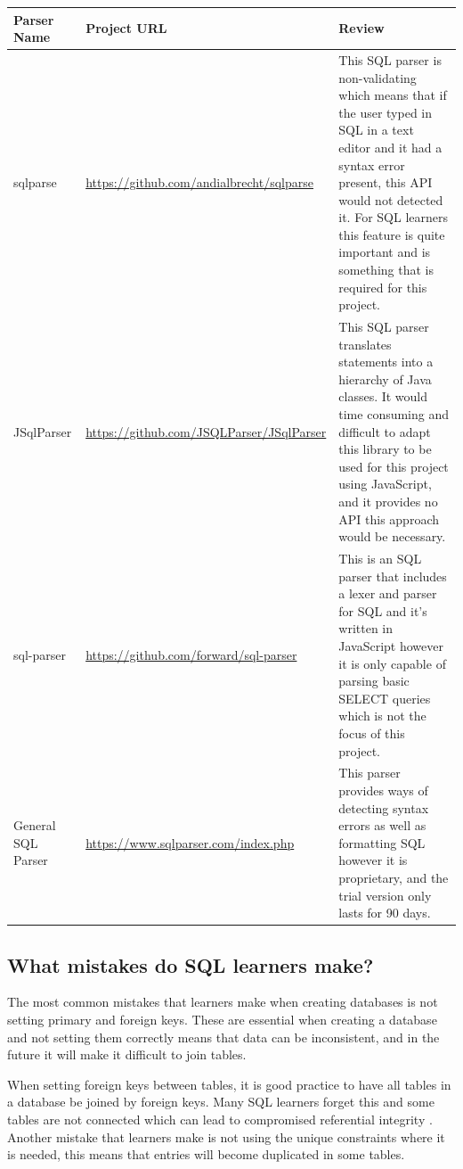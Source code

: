 \begin{center}
	\setlength\extrarowheight{2pt}
	\begin{tabularx}{\textwidth}{|X|X|X|}
		\hline
		\textbf{Parser Name} & \textbf{Project URL} & \textbf{Review} \\
		\hline
		sqlparse & \url{https://github.com/andialbrecht/sqlparse} &  This SQL parser is non-validating which means that if the user typed in SQL in a text editor and it had a syntax error present, this API would not detected it. For SQL learners this feature is quite important and is something that is required for this project.\\
		\hline
		JSqlParser & \url{https://github.com/JSQLParser/JSqlParser} &  This SQL parser translates statements into a hierarchy of Java classes. It would time consuming and difficult to adapt this library to be used for this project using JavaScript, and it provides no API this approach would be necessary.\\
		\hline
		sql-parser & \url{https://github.com/forward/sql-parser} & This is an SQL parser that includes a lexer and parser for SQL and it's written in JavaScript however it is only capable of parsing basic SELECT queries which is not the focus of this project.\\
		\hline
		General SQL Parser & \url{https://www.sqlparser.com/index.php} & This parser provides ways of detecting syntax errors as well as formatting SQL however it is proprietary, and the trial version only lasts for 90 days.\\
		\hline
	\end{tabularx}
	
\end{center}

\subsection{What mistakes do SQL learners make?}

The most common mistakes that learners make when creating databases is not setting primary and foreign keys. These are essential when creating a database and not setting them correctly means that data can be inconsistent, and in the future it will make it difficult to join tables.

When setting foreign keys between tables, it is good practice to have all tables in a database be joined by foreign keys. Many SQL learners forget this and some tables are not connected which can lead to compromised referential integrity \cite{astera}. Another mistake that learners make is not using the unique constraints where it is needed, this means that entries will become duplicated in some tables. 

